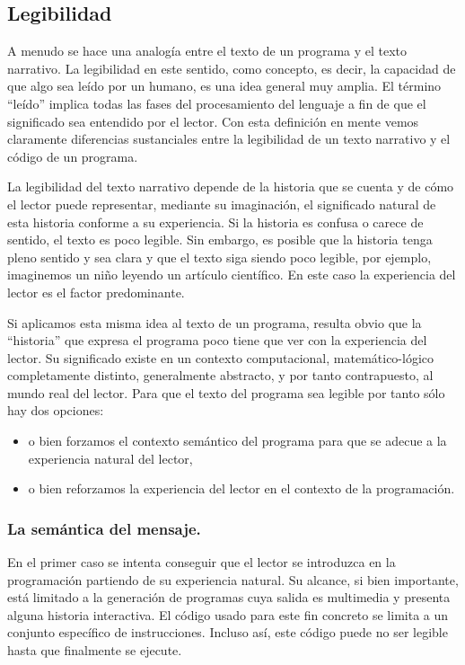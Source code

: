 \documentclass{llncs}
\begin{document}
\subsection{Legibilidad}
\label{subsec:readability}
A menudo se hace una analogía entre el texto de un programa y el texto narrativo. La legibilidad en este sentido, como concepto, es decir, la capacidad de que algo sea leído por un humano, es una idea general muy amplia. El término ``leído'' implica todas las fases del procesamiento del lenguaje a fin de que el significado sea entendido por el lector. Con esta definición en mente vemos claramente diferencias sustanciales entre la legibilidad de un texto narrativo y el código de un programa. 

La legibilidad del texto narrativo depende de la historia que se cuenta y de cómo el lector puede representar, mediante su imaginación, el significado natural de esta historia conforme a su experiencia. Si la historia es confusa o carece de sentido, el texto es poco legible. Sin embargo, es posible que la historia tenga pleno sentido y sea clara y que el texto siga siendo poco legible, por ejemplo, imaginemos un niño leyendo un artículo científico. En este caso la experiencia del lector es el factor predominante. 

Si aplicamos esta misma idea al texto de un programa, resulta obvio que la ``historia'' que expresa el programa poco tiene que ver con la experiencia del lector. Su significado existe en un contexto computacional, matemático-lógico completamente distinto, generalmente abstracto, y por tanto contrapuesto, al mundo real del lector. Para que el texto del programa sea legible por tanto sólo hay dos opciones: 

\begin{itemize}
\item o bien forzamos el contexto semántico del programa para que se adecue a la experiencia natural del lector, 
\item o bien reforzamos la experiencia del lector en el contexto de la programación. 
\end{itemize}

\subsubsection{La semántica del mensaje.}
\label{subsec:message}

En el primer caso se intenta conseguir que el lector se introduzca en la programación partiendo de su experiencia natural. Su alcance, si bien importante, está limitado a la generación de programas cuya salida es multimedia y presenta alguna historia interactiva. El código usado para este fin concreto se limita a un conjunto específico de instrucciones. Incluso así, este código puede no ser legible hasta que finalmente se ejecute. 
\end{document}
